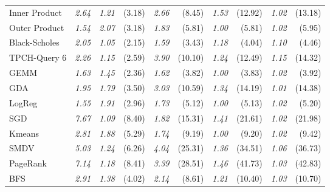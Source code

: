 \begin{table}[]
{\begin{tabular}{l|c|cr|cr|cr|cr}
Inner Product & \emph{2.64} & \emph{1.21} & (3.18) & \emph{2.66} &  (8.45) & \emph{1.53} & (12.92) & \emph{1.02} & (13.18) \\  %
Outer Product & \emph{1.54} & \emph{2.07} & (3.18) & \emph{1.83} &  (5.81) & \emph{1.00} &  (5.81) & \emph{1.02} &  (5.95) \\  %
Black-Scholes & \emph{2.05} & \emph{1.05} & (2.15) & \emph{1.59} &  (3.43) & \emph{1.18} &  (4.04) & \emph{1.10} &  (4.46) \\  %
TPCH-Query 6  & \emph{2.26} & \emph{1.15} & (2.59) & \emph{3.90} & (10.10) & \emph{1.24} & (12.49) & \emph{1.15} & (14.32) \\  %
GEMM          & \emph{1.63} & \emph{1.45} & (2.36) & \emph{1.62} &  (3.82) & \emph{1.00} &  (3.83) & \emph{1.02} &  (3.92) \\  %
GDA           & \emph{1.95} & \emph{1.79} & (3.50) & \emph{3.03} & (10.59) & \emph{1.34} & (14.19) & \emph{1.01} & (14.38) \\  %
LogReg        & \emph{1.55} & \emph{1.91} & (2.96) & \emph{1.73} &  (5.12) & \emph{1.00} &  (5.13) & \emph{1.02} &  (5.20) \\  %
SGD           & \emph{7.67} & \emph{1.09} & (8.40) & \emph{1.82} & (15.31) & \emph{1.41} & (21.61) & \emph{1.02} & (21.98) \\  %
Kmeans        & \emph{2.81} & \emph{1.88} & (5.29) & \emph{1.74} &  (9.19) & \emph{1.00} &  (9.20) & \emph{1.02} &  (9.42) \\  %
SMDV          & \emph{5.03} & \emph{1.24} & (6.26) & \emph{4.04} & (25.31) & \emph{1.36} & (34.51) & \emph{1.06} & (36.73) \\  %
PageRank      & \emph{7.14} & \emph{1.18} & (8.41) & \emph{3.39} & (28.51) & \emph{1.46} & (41.73) & \emph{1.03} & (42.83) \\  %
BFS           & \emph{2.91} & \emph{1.38} & (4.02) & \emph{2.14} &  (8.61) & \emph{1.21} & (10.40) & \emph{1.03} & (10.70) \\ \midrule  %

\end{tabular}}
\end{table}
